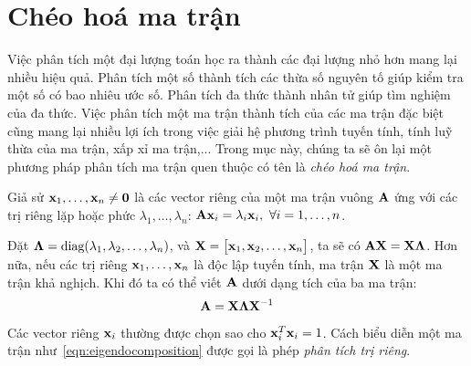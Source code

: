 


\section{Chéo hoá ma trận} %
\label{sec:cheo_hoa_ma_tran}

Việc phân tích một đại lượng toán học ra thành các đại lượng nhỏ hơn mang lại
nhiều hiệu quả. Phân tích một số thành tích các thừa số nguyên tố giúp kiểm tra
một số có bao nhiêu ước số. Phân tích đa thức thành nhân tử giúp tìm nghiệm của
đa thức. Việc phân tích một ma trận thành tích của các ma trận đặc biệt cũng mang lại nhiều lợi ích trong việc giải hệ phương trình tuyến tính,
tính luỹ thừa của ma trận, xấp xỉ ma trận,... Trong mục này, chúng ta sẽ ôn
lại một phương pháp phân tích ma trận quen thuộc có tên là \textit{chéo hoá ma
trận}.

Giả sử $\mathbf{x}_1, \dots, \mathbf{x}_n \neq \mathbf{0}$ là các vector riêng của một ma trận
vuông $\mathbf{A}$ ứng với các trị riêng lặp hoặc phức $\lambda_1, \dots, \lambda_n$:
\begin{math}
\mathbf{A}\mathbf{x}_i = \lambda_i \mathbf{x}_i, ~\forall i = 1, \dots, n
\end{math}.

Đặt $\boldsymbol{\Lambda} = \text{diag}(\lambda_1, \lambda_2, \dots, \lambda_n)$, và
$\mathbf{X} = \left[\begin{matrix} \mathbf{x}_1, \mathbf{x}_2, \dots, \mathbf{x}_n \end{matrix}\right]$, ta sẽ có $\mathbf{A}\mathbf{X} = \mathbf{X}\boldsymbol{\Lambda}$.
Hơn nữa, nếu các trị riêng $\mathbf{x}_1, \dots, \mathbf{x}_n$ là độc lập tuyến tính, ma trận
$\mathbf{X}$ là một ma trận khả nghịch. Khi đó ta có thể viết $\mathbf{A}$ dưới dạng tích của
ba ma trận:
\begin{equation}
\label{eqn:eigendocomposition}
\mathbf{A} = \mathbf{X}\boldsymbol{\Lambda}\mathbf{X}^{-1}
\end{equation}
Các vector riêng $\mathbf{x}_i$ thường được chọn sao cho $\mathbf{x}_i^T\mathbf{x}_i = 1$. Cách biểu
diễn một ma trận như~\eqref{eqn:eigendocomposition} được gọi là phép
\textit{phân tích trị riêng}.

